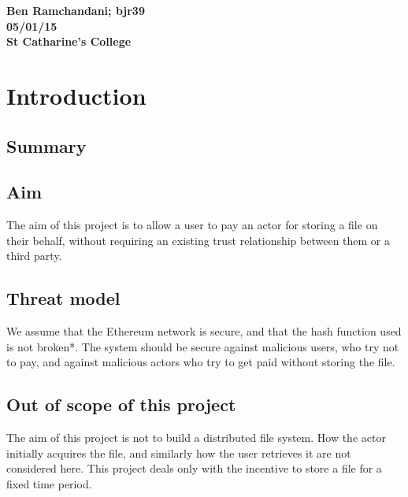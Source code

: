 \documentclass[10pt,twoside,a4paper]{article}
\newcommand{\workdate}{05/01/15}
\newcommand{\studentname}{Ben Ramchandani}
\newcommand{\studentid}{bjr39}
\begin{document}
\author{\studentname}

\date{\workdate}


\textbf{\studentname; \studentid}\\
\textbf{\workdate}\\
\textbf{St Catharine's College}



\tableofcontents

\listoffigures

\newpage

\section{Introduction}

\subsection{Summary}


\subsection{Aim}

The aim of this project is to allow a user to pay an actor for storing a file on their behalf, without requiring an existing trust relationship between them or a third party.


\subsection{Threat model}

We assume that the Ethereum network is secure, and that the hash function used is not broken*.
The system should be secure against malicious users, who try not to pay,
and against malicious actors who try to get paid without storing the file.

\subsection{Out of scope of this project}

The aim of this project is not to build a distributed file system.
How the actor initially acquires the file, and similarly how the user retrieves it are not considered here.
This project deals only with the incentive to store a file for a fixed time period.
\end{document}
